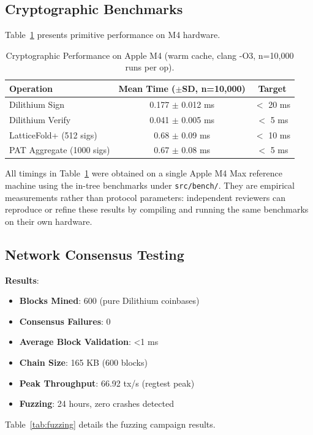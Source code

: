 \documentclass[10pt]{article}
\begin{document}
\subsection{Cryptographic Benchmarks}
Table~\ref{tab:crypto_bench} presents primitive performance on M4 hardware.

\begin{table}[h]
\centering
\begin{tabular}{@{}lcc@{}}
\toprule
\textbf{Operation} & \textbf{Mean Time ($\pm$SD, n=10,000)} & \textbf{Target} \\ \midrule
Dilithium Sign & 0.177 $\pm$ 0.012 ms & $<$ 20 ms \\
Dilithium Verify & 0.041 $\pm$ 0.005 ms & $<$ 5 ms \\
LatticeFold+ (512 sigs) & 0.68 $\pm$ 0.09 ms & $<$ 10 ms \\
PAT Aggregate (1000 sigs) & 0.67 $\pm$ 0.08 ms & $<$ 5 ms \\ \bottomrule
\end{tabular}
\caption{Cryptographic Performance on Apple M4 (warm cache, clang -O3, n=10,000 runs per op).}
\label{tab:crypto_bench}
\end{table}

All timings in Table~\ref{tab:crypto_bench} were obtained on a single Apple M4 Max reference machine using the in-tree benchmarks under \texttt{src/bench/}. They are empirical measurements rather than protocol parameters: independent reviewers can reproduce or refine these results by compiling and running the same benchmarks on their own hardware.

\subsection{Network Consensus Testing}
\textbf{Results}:
\begin{itemize}
\item \textbf{Blocks Mined}: 600 (pure Dilithium coinbases)
\item \textbf{Consensus Failures}: 0
\item \textbf{Average Block Validation}: <1 ms
\item \textbf{Chain Size}: 165 KB (600 blocks)
\item \textbf{Peak Throughput}: 66.92 tx/s (regtest peak)
\item \textbf{Fuzzing}: 24 hours, zero crashes detected
\end{itemize}

Table~\ref{tab:fuzzing} details the fuzzing campaign results.
\end{document}
